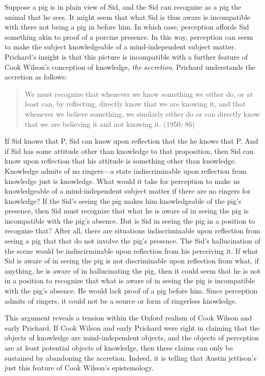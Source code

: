 \documentclass[11pt]{article}
\begin{document}
Suppose a pig is in plain view of Sid, and the Sid can recognize as a pig the animal that he sees. It might seem that what Sid is thus aware is incompatible with there not being a pig in before him. In which case, perception affords Sid something akin to proof of a porcine presence. In this way, perception can seem to make the subject knowledgeable of a mind-independent subject matter. Prichard's insight is that this picture is incompatible with a further feature of Cook Wilson's conception of knowledge, \emph{the accretion}. Prichard understands the accretion as follows:
\begin{quote}
	We must recognize that whenever we know something we either do, or at least can, by reflecting, directly know that we are knowing it, and that whenever we believe something, we similarly either do or can directly know that we are believing it and not knowing it. (1950: 86)
\end{quote}
If Sid knows that P, Sid can know upon reflection that the he knows that P. And if Sid has some attitude other than knowledge to that proposition, then Sid can know upon reflection that his attitude is something other than knowledge. Knowledge admits of no ringers---a state indiscriminable upon reflection from knowledge just is knowledge. What would it take for perception to make us knowledgeable of a mind-independent subject matter if there are no ringers for knowledge? If the Sid's seeing the pig makes him knowledgeable of the pig's presence, then Sid must recognize that what he is aware of in seeing the pig is incompatible with the pig's absence. But is Sid in seeing the pig in a position to recognize that? After all, there are situations indiscriminable upon reflection from seeing a pig that that do not involve the pig's presence. The Sid's hallucination of the scene would be indiscirminable upon reflection from his perceiving it. If what Sid is aware of in seeing the pig is not discriminable upon reflection from what, if anything, he is aware of in hallucinating the pig, then it could seem that he is not in a position to recognize that what is aware of in seeing the pig is incompatible with the pig's absence. He would lack proof of a pig before him. Since perception admits of ringers, it could not be a source or form of ringerless knowledge.

This argument reveals a tension within the Oxford realism of Cook Wilson and early Prichard. If Cook Wilson and early Prichard were right in claiming that the objects of knowledge are mind-independent objects, and the objects of perception are at least potential objects of knowledge, then these claims can only be sustained by abandoning the accretion. Indeed, it is telling that Austin jettison's just this feature of Cook Wilson's epistemology.
\end{document}
